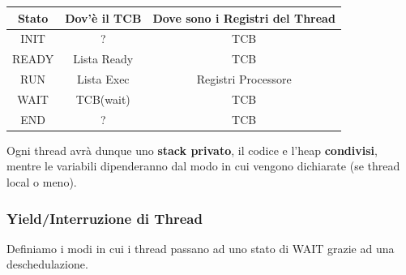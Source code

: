 \documentclass{article}
\begin{document}
\vspace*{5px}

\begin{center}
    \begin{tabular}{ c|c|c } 
    Stato & Dov'è il TCB & Dove sono i Registri del Thread \\ 
        \hline
    INIT & ? & TCB \\ 
    READY & Lista Ready & TCB \\
    RUN & Lista Exec & Registri Processore \\ 
    WAIT & TCB(wait) & TCB \\ 
    END & ? & TCB \\ 

    \hline
    \end{tabular}
    \end{center}

\vspace*{5px}


Ogni thread avrà dunque uno \textbf{stack privato}, il codice e l'heap \textbf{condivisi}, mentre le variabili dipenderanno dal modo in cui vengono
dichiarate (se thread local o meno). 


\newpage

\subsubsection{Yield/Interruzione di Thread}

Definiamo i modi in cui i thread passano ad uno stato di WAIT grazie ad una deschedulazione.
\end{document}
